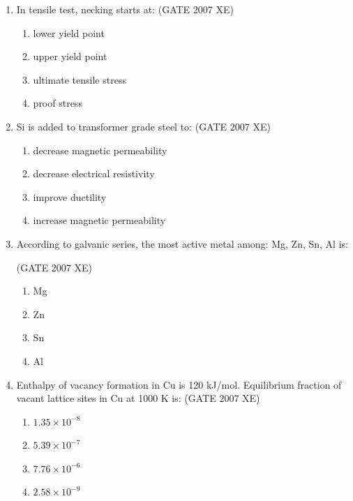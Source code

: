 \documentclass[journal,cmex10]{IEEEtran}
\theoremstyle{remark}
\numberwithin{equation}{enumi}
\numberwithin{figure}{enumi}
\begin{document}
\begin{enumerate}

\item  In tensile test, necking starts at:  
\hfill{(GATE 2007 XE)}
\begin{multicols}{2}
\begin{enumerate}
    \item lower yield point
    \item upper yield point
    \item ultimate tensile stress
    \item proof stress
\end{enumerate}
\end{multicols}


\item Si is added to transformer grade steel to:  
\hfill{(GATE 2007 XE)}
\begin{multicols}{2}
\begin{enumerate}
    \item decrease magnetic permeability
    \item decrease electrical resistivity
    \item improve ductility
    \item increase magnetic permeability
\end{enumerate}
\end{multicols}

\item According to galvanic series, the most active metal among: Mg, Zn, Sn, Al is:

\hfill{(GATE 2007 XE)}
\begin{multicols}{4}
\begin{enumerate}
    \item Mg
    \item Zn
    \item Sn
    \item Al
\end{enumerate}
\end{multicols}


\item Enthalpy of vacancy formation in Cu is 120 kJ/mol. Equilibrium fraction of vacant lattice sites in Cu at 1000 K is: 
\hfill{(GATE 2007 XE)}
\begin{multicols}{4}
\begin{enumerate}
    \item $1.35 \times 10^{-8}$
    \item $5.39 \times 10^{-7}$
    \item $7.76 \times 10^{-6}$
    \item $2.58 \times 10^{-9}$
\end{enumerate}
\end{multicols}


\end{enumerate}
\end{document}
